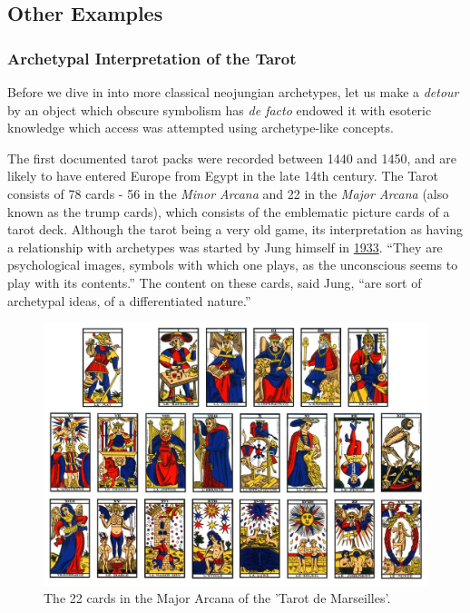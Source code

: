 \documentclass[
]{book}
\begin{document}
\hypertarget{other-examples}{%
\subsection{Other Examples}\label{other-examples}}

\hypertarget{archetypal-interpretation-of-the-tarot}{%
\subsubsection{Archetypal Interpretation of the Tarot}\label{archetypal-interpretation-of-the-tarot}}

Before we dive in into more classical neojungian archetypes, let us make a \emph{detour} by an object which obscure symbolism has \emph{de facto} endowed it with esoteric knowledge which access was attempted using archetype-like concepts.

The first documented tarot packs were recorded between 1440 and 1450, and are likely to have entered Europe from Egypt in the late 14th century. The Tarot consists of 78 cards - 56 in the \emph{Minor Arcana} and 22 in the \emph{Major Arcana} (also known as the trump cards), which consists of the emblematic picture cards of a tarot deck. Although the tarot being a very old game, its interpretation as having a relationship with archetypes was started by Jung himself in \href{https://marykgreer.com/2008/03/31/carl-jung-and-tarot/}{1933}. ``They are psychological images, symbols with which one plays, as the unconscious seems to play with its contents.'' The content on these cards, said Jung, ``are sort of archetypal ideas, of a differentiated nature.''

\begin{figure}

{\centering \includegraphics[width=\textwidth]{img/tarot} 

}

\caption{The 22 cards in the Major Arcana of the 'Tarot de Marseilles'.}\label{fig:unnamed-chunk-11}
\end{figure}
\end{document}
